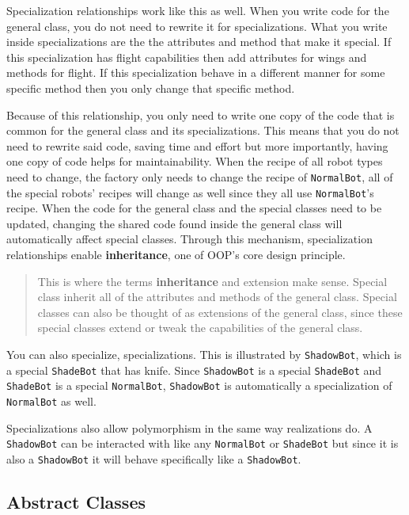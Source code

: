 Specialization relationships work like this as well. When you write code
for the general class, you do not need to rewrite it for
specializations. What you write inside specializations are the the
attributes and method that make it special. If this specialization has
flight capabilities then add attributes for wings and methods for
flight. If this specialization behave in a different manner for some
specific method then you only change that specific method.

Because of this relationship, you only need to write one copy of the
code that is common for the general class and its specializations. This
means that you do not need to rewrite said code, saving time and effort
but more importantly, having one copy of code helps for maintainability.
When the recipe of all robot types need to change, the factory only
needs to change the recipe of \texttt{NormalBot}, all of the special
robots' recipes will change as well since they all use
\texttt{NormalBot}'s recipe. When the code for the general class and the
special classes need to be updated, changing the shared code found
inside the general class will automatically affect special classes.
Through this mechanism, specialization relationships enable
\textbf{inheritance}, one of OOP's core design principle.

\begin{quote}
This is where the terms \textbf{inheritance} and extension make sense.
Special class inherit all of the attributes and methods of the general
class. Special classes can also be thought of as extensions of the
general class, since these special classes extend or tweak the
capabilities of the general class.
\end{quote}

You can also specialize, specializations. This is illustrated by
\texttt{ShadowBot}, which is a special \texttt{ShadeBot} that has knife.
Since \texttt{ShadowBot} is a special \texttt{ShadeBot} and
\texttt{ShadeBot} is a special \texttt{NormalBot}, \texttt{ShadowBot} is
automatically a specialization of \texttt{NormalBot} as well.

Specializations also allow polymorphism in the same way realizations do.
A \texttt{ShadowBot} can be interacted with like any \texttt{NormalBot}
or \texttt{ShadeBot} but since it is also a \texttt{ShadowBot} it will
behave specifically like a \texttt{ShadowBot}.

\subsection{Abstract
Classes}\label{class-relationships.md__abstract-classes}

